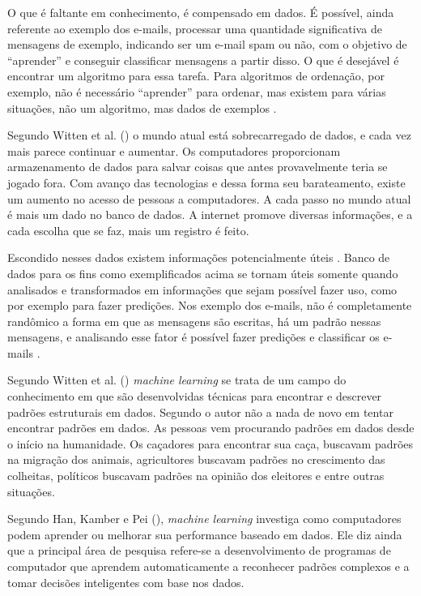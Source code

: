 O que é faltante em conhecimento, é compensado em dados. É possível, ainda referente ao exemplo dos e-mails, processar uma quantidade significativa de mensagens de exemplo, indicando ser um e-mail spam ou não, com o objetivo de “aprender” e conseguir classificar mensagens a partir disso. O que é desejável é encontrar um algoritmo para essa tarefa. Para algoritmos de ordenação, por exemplo, não é necessário “aprender” para ordenar, mas existem para várias situações, não um algoritmo, mas dados de exemplos \cite{Alpaydin:2010:IML:1734076}.


Segundo Witten et al. (\citeyear{Witten:2016:DMF:3086818}) o mundo atual está sobrecarregado de dados, e cada vez mais parece continuar e aumentar. Os computadores proporcionam armazenamento de dados para salvar coisas que antes provavelmente teria se jogado fora. Com avanço das tecnologias e dessa forma seu barateamento, existe um aumento no acesso de pessoas a computadores. A cada passo no mundo atual é mais um dado no banco de dados. A internet promove diversas informações, e a cada escolha que se faz, mais um registro é feito.	

Escondido nesses dados existem informações potencialmente úteis \cite{Witten:2016:DMF:3086818}. Banco de dados para os fins como exemplificados acima se tornam úteis somente quando analisados e transformados em informações que sejam possível fazer uso, como por exemplo para fazer predições. Nos exemplo dos e-mails, não é completamente randômico a forma em que as mensagens são escritas, há um padrão nessas mensagens, e analisando esse fator é possível fazer predições e classificar os e-mails \cite{Alpaydin:2010:IML:1734076}.

Segundo Witten et al. (\citeyear{Witten:2016:DMF:3086818}) \textit{machine learning} se trata de um campo do conhecimento em que são desenvolvidas técnicas para encontrar e descrever padrões estruturais em dados. Segundo o autor não a nada de novo em tentar encontrar padrões em dados. As pessoas vem procurando padrões em dados desde o início na humanidade. Os caçadores para encontrar sua caça, buscavam padrões na migração dos animais, agricultores buscavam padrões no crescimento das colheitas, políticos buscavam padrões na opinião dos eleitores e entre outras situações. 

Segundo Han, Kamber e Pei (\citeyear{Han:2011:DMC:1972541}), \textit{machine learning} investiga como computadores podem aprender ou melhorar sua performance baseado em dados. Ele diz ainda que a principal área de pesquisa refere-se a desenvolvimento de programas de computador que aprendem automaticamente a reconhecer padrões complexos e a tomar decisões inteligentes com base nos dados.

